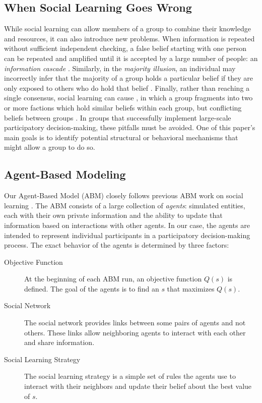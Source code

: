 \documentclass[manuscript,screen,review,acmsmall]{acmart}
\begin{document}
\subsection{When Social Learning Goes Wrong}
While social learning can allow members of a group to combine their knowledge and resources,
it can also introduce new problems.
When information is repeated without sufficient independent checking,
a false belief starting with one person can be repeated and amplified until it is accepted by a large number of people:
an {\em information cascade} \cite{banerjee_simple_1992}.
Similarly, in the {\em majority illusion},
an individual may incorrectly infer that the majority of a group holds a particular belief if they are only exposed to others who do hold that belief \cite{lerman_majority_2015}.
Finally,
rather than reaching a single consensus,
social learning can cause {\polarization},
in which a group fragments into two or more factions which hold similar beliefs within each group,
but conflicting beliefs between groups
\cite{schkade_what_2007}.
In groups that successfully implement large-scale participatory decision-making,
these pitfalls must be avoided.
One of this paper's main goals is to identify potential structural or behavioral mechanisms that might allow a group to do so.

\subsection{Agent-Based Modeling\label{subsec:abm}}
Our Agent-Based Model (ABM) closely follows previous ABM work on social learning
\cite{lazer_network_2007, barkoczi_social_2016, gomez_clustering_2019}.
The ABM consists of a large collection of {\em agents}:
simulated entities, each with their own private information and the ability to update that information based on interactions with other agents.
In our case, the agents are intended to represent
individual participants in a participatory decision-making
process.
The exact behavior of the agents is determined by three factors:
\begin{description}
\item[Objective Function]
At the beginning of each ABM run, an objective function $Q(s)$ is defined.
The goal of the agents is to find an $s$ that maximizes
$Q(s)$.
\item[Social Network]
The social network provides links between some pairs of agents and not others.
These links allow neighboring agents to interact with each other and share information.
\item[Social Learning Strategy]
The social learning strategy is a simple set of rules the agents use to interact with their neighbors and update their belief about the best value of $s$.
\end{description}
\end{document}
